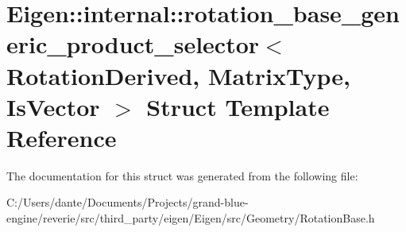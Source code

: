 \hypertarget{struct_eigen_1_1internal_1_1rotation__base__generic__product__selector}{}\section{Eigen\+::internal\+::rotation\+\_\+base\+\_\+generic\+\_\+product\+\_\+selector$<$ Rotation\+Derived, Matrix\+Type, Is\+Vector $>$ Struct Template Reference}
\label{struct_eigen_1_1internal_1_1rotation__base__generic__product__selector}


The documentation for this struct was generated from the following file\+:\begin{DoxyCompactItemize}
\item 
C\+:/\+Users/dante/\+Documents/\+Projects/grand-\/blue-\/engine/reverie/src/third\+\_\+party/eigen/\+Eigen/src/\+Geometry/Rotation\+Base.\+h\end{DoxyCompactItemize}
